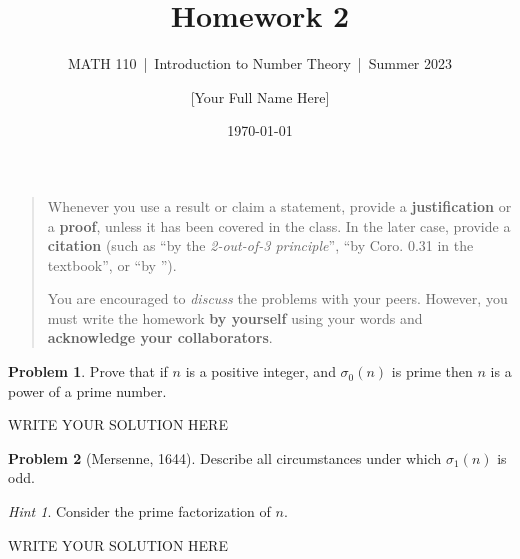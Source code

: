 \documentclass[11pt]{article}
\title{Homework 2}
\author{[Your Full Name Here]}
\subtitle{MATH 110~|~Introduction to Number Theory~|~Summer 2023}
\date{\today}
\theoremstyle{plain}
\theoremstyle{definition}
\newtheorem{problem}{Problem}
\theoremstyle{remark}
\newtheorem*{hint}{Hint}
\numberwithin{equation}{problem}
\begin{document}
\maketitle

\begin{quotation}
	Whenever you use a result or claim a statement, provide a \textbf{justification} or a \textbf{proof}, unless it has been covered in the class. In the later case, provide a \textbf{citation} (such as ``by the \emph{2-out-of-3 principle}'', ``by Coro. 0.31 in the textbook'', or ``by \cite[Coro. 0.31]{texbook}'').

	You are encouraged to \emph{discuss} the problems with your peers. However, you must write the homework \textbf{by yourself} using your words and \textbf{acknowledge your collaborators}.
\end{quotation}



\begin{problem}
	Prove that if $n$ is a positive integer, and $\sigma_0(n)$ is prime then $n$ is a power of a prime number.
\end{problem}
\begin{solution} %
WRITE YOUR SOLUTION HERE
\end{solution}\clearpage %

\begin{problem}[Mersenne, 1644]
	Describe all circumstances under which $\sigma_1(n)$ is odd.
	\begin{hint}
		Consider the prime factorization of $n$.
	\end{hint}
\end{problem}
\begin{solution} %
WRITE YOUR SOLUTION HERE
\end{solution}\clearpage %
\end{document}
